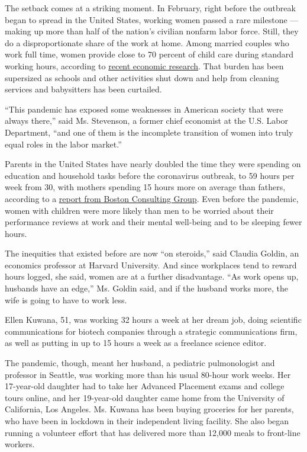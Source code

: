 The setback comes at a striking moment. In February, right before the
outbreak began to spread in the United States, working women passed a
rare milestone --- making up more than half of the nation's civilian
nonfarm labor force. Still, they do a disproportionate share of the work
at home. Among married couples who work full time, women provide close
to 70 percent of child care during standard working hours, according to
\href{http://faculty.wcas.northwestern.edu/~mdo738/research/Alon_Doepke_Olmstead-Rumsey_Tertilt_COVID_2020.pdf}{recent
economic research}. That burden has been supersized as schools and other
activities shut down and help from cleaning services and babysitters has
been curtailed.

``This pandemic has exposed some weaknesses in American society that
were always there,'' said Ms. Stevenson, a former chief economist at the
U.S. Labor Department, ``and one of them is the incomplete transition of
women into truly equal roles in the labor market.''

Parents in the United States have nearly doubled the time they were
spending on education and household tasks before the coronavirus
outbreak, to 59 hours per week from 30, with mothers spending 15 hours
more on average than fathers, according to a
\href{https://www.bcg.com/publications/2020/helping-working-parents-ease-the-burden-of-covid-19.aspx}{report
from Boston Consulting Group}. Even before the pandemic, women with
children were more likely than men to be worried about their performance
reviews at work and their mental well-being and to be sleeping fewer
hours.

The inequities that existed before are now ``on steroids,'' said Claudia
Goldin, an economics professor at Harvard University. And since
workplaces tend to reward hours logged, she said, women are at a further
disadvantage. ``As work opens up, husbands have an edge,'' Ms. Goldin
said, and if the husband works more, the wife is going to have to work
less.

Ellen Kuwana, 51, was working 32 hours a week at her dream job, doing
scientific communications for biotech companies through a strategic
communications firm, as well as putting in up to 15 hours a week as a
freelance science editor.

The pandemic, though, meant her husband, a pediatric pulmonologist and
professor in Seattle, was working more than his usual 80-hour work
weeks. Her 17-year-old daughter had to take her Advanced Placement exams
and college tours online, and her 19-year-old daughter came home from
the University of California, Los Angeles. Ms. Kuwana has been buying
groceries for her parents, who have been in lockdown in their
independent living facility. She also began running a volunteer effort
that has delivered more than 12,000 meals to front-line workers.

